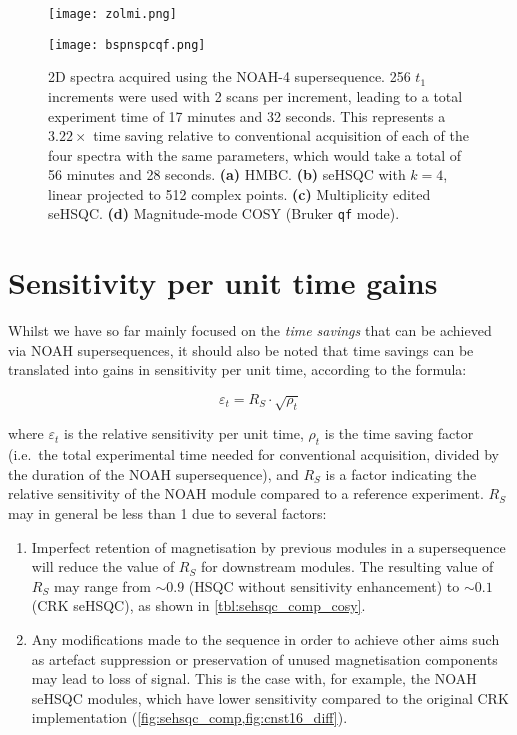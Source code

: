\begin{figure}
    \centering
    \texttt{[image: zolmi.png]}\phantom{aaaaaa}

    \texttt{[image: bspnspcqf.png]}
    \caption{
        2D spectra acquired using the NOAH-4  supersequence.
        256 $t_1$ increments were used with 2 scans per increment, leading to a total experiment time of 17 minutes and 32 seconds.
        This represents a $3.22\times$ time saving relative to conventional acquisition of each of the four spectra with the same parameters, which would take a total of 56 minutes and 28 seconds.
        \textbf{(a)} HMBC.
        \textbf{(b)} \nitrogen{} seHSQC with $k = 4$, linear projected to 512 complex points.
        \textbf{(c)} Multiplicity edited \carbon{} seHSQC.
        \textbf{(d)} Magnitude-mode COSY (Bruker \texttt{qf} mode).
        \zolmi{}
    }
    \label{fig:bspnspcqf}
\end{figure}

\section{Sensitivity per unit time gains}

Whilst we have so far mainly focused on the \textit{time savings} that can be achieved via NOAH supersequences, it should also be noted that time savings can be translated into gains in sensitivity per unit time, according to the formula:

$$\varepsilon_t = R_S \cdot \sqrt{\rho_t}$$

where $\varepsilon_t$ is the relative sensitivity per unit time, $\rho_t$ is the time saving factor (i.e.\ the total experimental time needed for conventional acquisition, divided by the duration of the NOAH supersequence), and $R_S$ is a factor indicating the relative sensitivity of the NOAH module compared to a reference experiment.
$R_S$ may in general be less than 1 due to several factors:

\begin{enumerate}
    \item Imperfect retention of magnetisation by previous modules in a supersequence will reduce the value of $R_S$ for downstream modules.
        The resulting value of $R_S$ may range from $\sim 0.9$ (HSQC without sensitivity enhancement) to $\sim 0.1$ (CRK seHSQC), as shown in \cref{tbl:sehsqc_comp_cosy}.
    \item Any modifications made to the sequence in order to achieve other aims such as artefact suppression or preservation of unused magnetisation components may lead to loss of signal.
        This is the case with, for example, the NOAH seHSQC modules, which have lower sensitivity compared to the original CRK implementation (\cref{fig:sehsqc_comp,fig:cnst16_diff}).
\end{enumerate}

